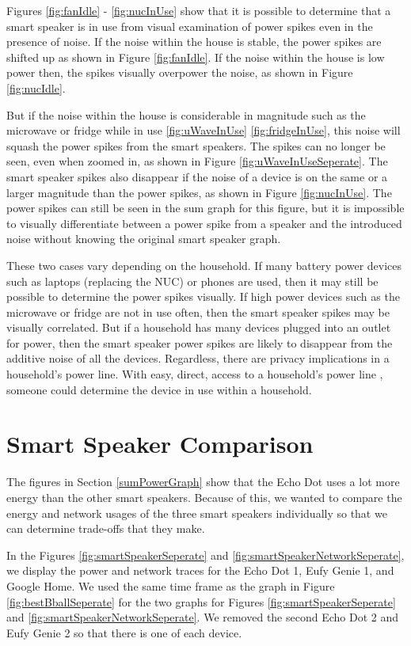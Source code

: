Figures \ref{fig:fanIdle} - \ref{fig:nucInUse} show that it is possible to determine that a smart speaker is in use from visual examination of power spikes even in the presence of noise. If the noise within the house is stable, the power spikes are shifted up as shown in Figure \ref{fig:fanIdle}. If the noise within the house is low power then, the spikes visually overpower the noise, as shown in Figure \ref{fig:nucIdle}.

But if the noise within the house is considerable in magnitude such as the microwave or fridge while in use \ref{fig:uWaveInUse} \ref{fig:fridgeInUse}, this noise will squash the power spikes from the smart speakers. The spikes can no longer be seen, even when zoomed in, as shown in Figure \ref{fig:uWaveInUseSeperate}. The smart speaker spikes also disappear if the noise of a device is on the same or a larger magnitude than the power spikes, as shown in Figure \ref{fig:nucInUse}. The power spikes can still be seen in the sum graph for this figure, but it is impossible to visually differentiate between a power spike from a speaker and the introduced noise without knowing the original smart speaker graph.

These two cases vary depending on the household. If many battery power devices such as laptops (replacing the NUC) or phones are used, then it may still be possible to determine the power spikes visually. If high power devices such as the microwave or fridge are not in use often, then the smart speaker spikes may be visually correlated. But if a household has many devices plugged into an outlet for power, then the smart speaker power spikes are likely to disappear from the additive noise of all the devices. Regardless, there are privacy implications in a household's power line. With easy, direct, access to a household's power line \cite{griffith_2017}, someone could determine the device in use within a household.

\section{Smart Speaker Comparison}
\label{smartSpeakerComparisonSection}
The figures in Section \ref{sumPowerGraph} show that the Echo Dot uses a lot more energy than the other smart speakers. Because of this, we wanted to compare the energy and network usages of the three smart speakers individually so that we can determine trade-offs that they make.

In the Figures \ref{fig:smartSpeakerSeperate} and \ref{fig:smartSpeakerNetworkSeperate}, we display the power and network traces for the Echo Dot 1, Eufy Genie 1, and Google Home. We used the same time frame as the graph in Figure \ref{fig:bestBballSeperate} for the two graphs for Figures \ref{fig:smartSpeakerSeperate} and \ref{fig:smartSpeakerNetworkSeperate}. We removed the second Echo Dot 2 and Eufy Genie 2 so that there is one of each device.

